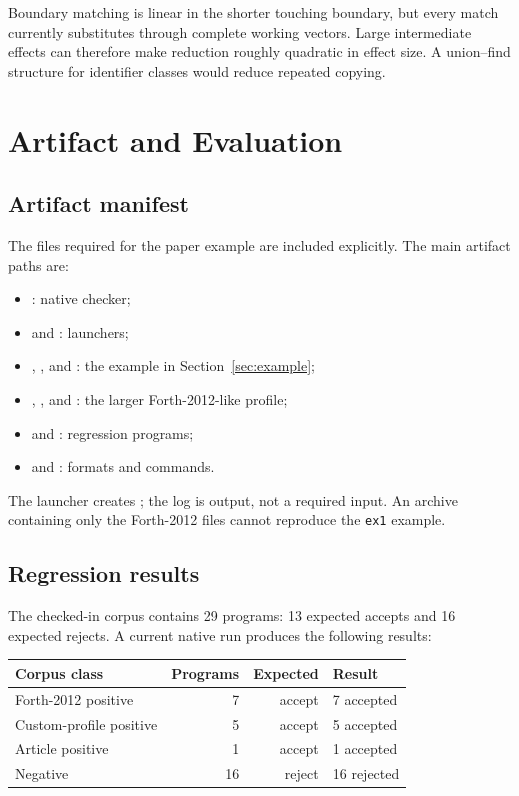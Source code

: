 \documentclass[11pt,a4paper]{article}
\begin{document}
Boundary matching is linear in the shorter touching boundary, but every match
currently substitutes through complete working vectors.  Large intermediate
effects can therefore make reduction roughly quadratic in effect size.  A
union--find structure for identifier classes would reduce repeated copying.

\section{Artifact and Evaluation}
\label{sec:artifact}

\subsection{Artifact manifest}

The files required for the paper example are included explicitly.  The main
artifact paths are:

\begin{itemize}
  \item {}: native checker;
  \item {} and
        : launchers;
  \item {}, , and
        : the example in Section~\ref{sec:example};
  \item {}, , and
        : the larger Forth-2012-like profile;
  \item {} and : regression
        programs;
  \item {} and : formats and commands.
\end{itemize}

The launcher creates ; the log is output, not a required
input.  An archive containing only the Forth-2012 files cannot reproduce the
\texttt{ex1} example.

\subsection{Regression results}

The checked-in corpus contains 29 programs: 13 expected accepts and 16
expected rejects.  A current native run produces the following results:

\begin{center}
\small
\begin{tabular}{@{}lrrl@{}}
\hline
Corpus class & Programs & Expected & Result \\
\hline
Forth-2012 positive & 7 & accept & 7 accepted \\
Custom-profile positive & 5 & accept & 5 accepted \\
Article positive & 1 & accept & 1 accepted \\
Negative & 16 & reject & 16 rejected \\
\hline
\end{tabular}
\end{center}
\end{document}
